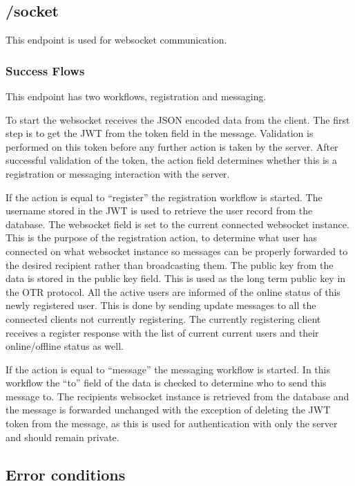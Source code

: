 \subsection{/socket}


This endpoint is used for websocket communication.


\subsubsection{Success Flows}


This endpoint has two workflows, registration and messaging.


To start the websocket receives the JSON encoded data from the client. The first step is to get the JWT from the token field in the message. Validation is performed on this token before any further action is taken by the server. After successful validation of the token, the action field determines whether this is a registration or messaging interaction with the server.


If the action is equal to “register” the registration workflow is started. The username stored in the JWT is used to retrieve the user record from the database. The websocket field is set to the current connected websocket instance. This is the purpose of the registration action, to determine what user has connected on what websocket instance so messages can be properly forwarded to the desired recipient rather than broadcasting them. The public key from the data is stored in the public key field. This is used as the long term public key in the OTR protocol. All the active users are informed of the online status of this newly registered user. This is done by sending update messages to all the connected clients not currently registering. The currently registering client receives a register response with the list of current current users and their online/offline status as well.


If the action is equal to “message” the messaging workflow is started. In this workflow the “to” field of the data is checked to determine who to send this message to. The recipients websocket instance is retrieved from the database and the message is forwarded unchanged with the exception of deleting the JWT token from the message, as this is used for authentication with only the server and should remain private.


\subsection{Error conditions}


